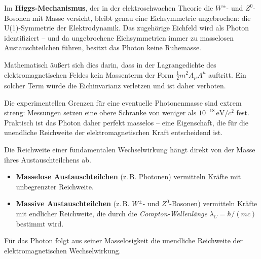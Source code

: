 Im \textbf{Higgs-Mechanismus}, der in der elektroschwachen Theorie die \(W^\pm\)- und \(Z^0\)-Bosonen mit Masse versieht, bleibt genau eine Eichsymmetrie ungebrochen: die U(1)-Symmetrie der Elektrodynamik.  
Das zugehörige Eichfeld wird als Photon identifiziert – und da ungebrochene Eichsymmetrien immer zu masselosen Austauschteilchen führen, besitzt das Photon keine Ruhemasse.

Mathematisch äußert sich dies darin, dass in der Lagrangedichte des elektromagnetischen Feldes kein Massenterm der Form \(\frac{1}{2} m^2 A_\mu A^\mu\) auftritt.  
Ein solcher Term würde die Eichinvarianz verletzen und ist daher verboten.

Die experimentellen Grenzen für eine eventuelle Photonenmasse sind extrem streng:  
Messungen setzen eine obere Schranke von weniger als \(10^{-18}\,\mathrm{eV}/c^2\) fest.  
Praktisch ist das Photon daher perfekt masselos – eine Eigenschaft, die für die unendliche Reichweite der elektromagnetischen Kraft entscheidend ist.
\vspace{1em}
\begin{tcolorbox}[hinweisbox, title=Masselosigkeit und Reichweite]
	\label{box:reichweite_masselos}
	\small
	Die Reichweite einer fundamentalen Wechselwirkung hängt direkt von der Masse ihres Austauschteilchens ab.  
	\begin{itemize}
		\item \textbf{Masselose Austauschteilchen} (z.\,B. Photonen) vermitteln Kräfte mit unbegrenzter Reichweite.  
		\item \textbf{Massive Austauschteilchen} (z.\,B. \(W^\pm\)- und \(Z^0\)-Bosonen) vermitteln Kräfte mit endlicher Reichweite, die durch die \emph{Compton-Wellenlänge} \(\lambda_C = \hbar/(mc)\) bestimmt wird.
	\end{itemize}
	Für das Photon folgt aus seiner Masselosigkeit die unendliche Reichweite der elektromagnetischen Wechselwirkung.
\end{tcolorbox}
\vspace{1em}
